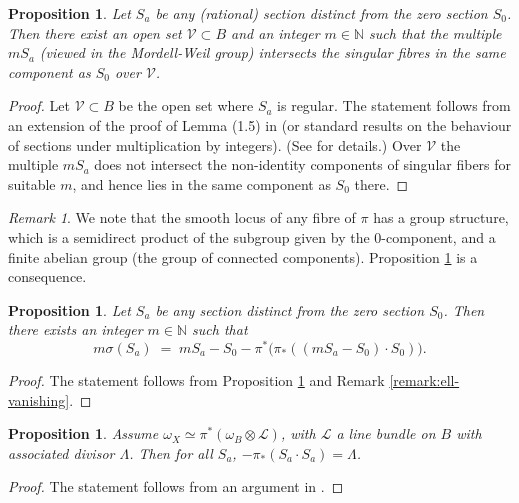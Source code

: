 \documentclass[11pt]{amsart}
\newtheorem{proposition}[theorem]{Proposition}
\theoremstyle{definition}
\theoremstyle{definition}
\theoremstyle{remark}
\newtheorem{remark}[theorem]{Remark}
\theoremstyle{remark}
\theoremstyle{definition}
\theoremstyle{conjecture}
\begin{document}
\begin{proposition}\label{prop:CoxZucker}
  Let $S_a$ be any (rational) section distinct from the zero section $S_0$.  Then there  exist an open set $\mathcal{V} \subset B$  and  an integer $m\in\mathbb{N}$ such that the multiple $m S_a$ (viewed in the Mordell-Weil group) intersects  the singular fibres in the same component as $S_0$ over $\mathcal{V}$.
\end{proposition}

\begin{proof} Let $\mathcal{V} \subset B$ be the open set where $S_a$ is regular. 
  The statement follows from an extension of the proof of Lemma (1.5) in \cite{CoxZucker1979} (or standard results on the behaviour of sections under multiplication by integers). 
   (See  \cite{Lee:2018ihr} for details.)  Over $\mathcal{V}$  the multiple $mS_a$  does not intersect the non-identity components of singular fibers for suitable $m$, and hence lies in the same component as $S_0$ there. \end{proof}


\begin{remark}
We note
that the smooth locus of any fibre of $\pi$ has a group structure,
which is a semidirect product of the subgroup given by the
0-component, and a finite abelian group (the group of connected
components). Proposition \ref{prop:CoxZucker} is a consequence.
\end{remark}



\begin{proposition}\label{prop:mSa}
    Let $S_a$ be any section distinct from the zero section $S_0$.  Then there exists an integer $m\in\mathbb{N}$ such that   
	\begin{equation}\label{eq:shioda-general2}
		m\sigma(S_a) \;=\; mS_a - S_0
		- \pi^*\!\bigl(\pi_*( (mS_a - S_0)\cdot S_0 )\bigr).
	\end{equation}
\end{proposition}

\begin{proof} The statement follows from  Proposition \ref{prop:CoxZucker} and Remark \ref{remark:ell-vanishing}. \end{proof}
	
\begin{proposition}\label{prop:fmw}
Assume $\omega_X \simeq \pi^*(\omega_B \otimes \mathcal{L})$, with $\mathcal{L}$ a line bundle on $B$ with associated divisor $\Lambda$. Then for all $S_a$, $-\pi_\ast(S_a \cdot S_a) = \Lambda$.
\end{proposition}
\begin{proof}
The statement follows from an argument in \cite[(7.30)]{FMW1997}.\end{proof}
\end{document}
